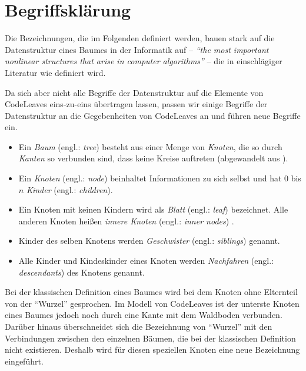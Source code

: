 \section{Begriffsklärung}
\label{sec:naming}

Die Bezeichnungen, die im Folgenden definiert werden, bauen stark auf die Datenstruktur eines Baumes in der Informatik auf -- \textit{"`the most important nonlinear structures that arise in computer algorithms"'}\cite{knuth1973fundamental} -- die in einschlägiger Literatur wie \cite{knuth1973fundamental, ernst2016grundkurs, gumm2009einfuehrung} definiert wird.

Da sich aber nicht alle Begriffe der Datenstruktur auf die Elemente von CodeLeaves eins-zu-eins übertragen lassen, passen wir einige Begriffe der Datenstruktur an die Gegebenheiten von CodeLeaves an und führen neue Begriffe ein.

\begin{itemize}
  \item Ein \textit{Baum} (engl.: \textit{tree}) besteht aus einer Menge von \textit{Knoten}, die so durch \textit{Kanten} so verbunden sind, dass keine Kreise auftreten (abgewandelt aus \cite{gumm2009einfuehrung, ernst2016grundkurs}).
  \item Ein \textit{Knoten} (engl.: \textit{node}) beinhaltet Informationen zu sich selbst und hat $0$ bis $n$ \textit{Kinder} (engl.: \textit{children}).
  \item Ein Knoten mit keinen Kindern wird als \textit{Blatt} (engl.: \textit{leaf}) bezeichnet. Alle anderen Knoten heißen \textit{innere Knoten} (engl.: \textit{inner nodes}) \cite{gumm2009einfuehrung}.
  \item Kinder des selben Knotens werden \textit{Geschwister} (engl.: \textit{siblings}) genannt.
  \item Alle Kinder und Kindeskinder eines Knoten werden \textit{Nachfahren} (engl.: \textit{descendants}) des Knotens genannt.
\end{itemize}

Bei der klassischen Definition eines Baumes wird bei dem Knoten ohne Elternteil von der "`Wurzel"' gesprochen. Im Modell von CodeLeaves ist der unterste Knoten eines Baumes jedoch noch durch eine Kante mit dem Waldboden verbunden. Darüber hinaus überschneidet sich die Bezeichnung von "`Wurzel"' mit den Verbindungen zwischen den einzelnen Bäumen, die bei der klassischen Definition nicht existieren. Deshalb wird für diesen speziellen Knoten eine neue Bezeichnung eingeführt.

